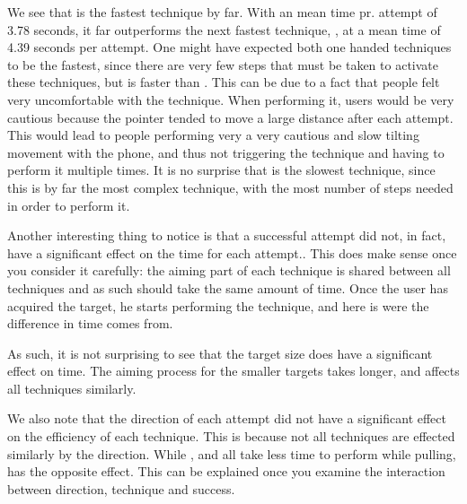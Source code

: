 We see that \swipe is the fastest technique by far.
With an mean time pr. attempt of 3.78 seconds, it far outperforms the next fastest technique, \throw, at a mean time of 4.39 seconds per attempt. 
One might have expected both one handed techniques to be the fastest, since there are very few steps that must be taken to activate these techniques, but \throw is faster than \tilt. 
This can be due to a fact that people felt very uncomfortable with the \tilt technique.
When performing it, users would be very cautious because the pointer tended to move a large distance after each attempt.
This would lead to people performing very a very cautious and slow tilting movement with the phone, and thus not triggering the technique and having to perform it multiple times. 
It is no surprise that \grab is the slowest technique, since this is by far the most complex technique, with the most number of steps needed in order to perform it.

Another interesting thing to notice is that a successful attempt did not, in fact, have a significant effect on the time for each attempt.. 
This does make sense once you consider it carefully: the aiming part of each technique is shared between all techniques and as such should take the same amount of time.
Once the user has acquired the target, he starts performing the technique, and here is were the difference in time comes from.

As such, it is not surprising to see that the target size does have a significant effect on time.
The aiming process for the smaller targets takes longer, and affects all techniques similarly.

We also note that the direction of each attempt did not have a significant effect on the efficiency of each technique. 
This is because not all techniques are effected similarly by the direction. 
While \swipe, \throw and \tilt all take less time to perform while pulling, \grab has the opposite effect.
This can be explained once you examine the interaction between direction, technique and success.

